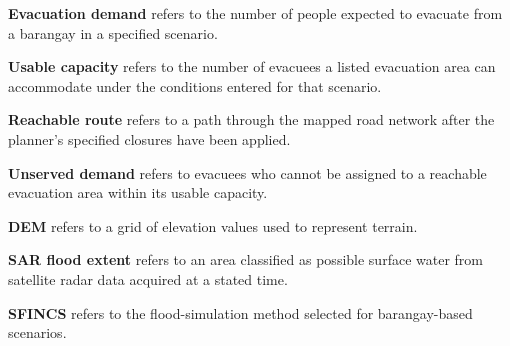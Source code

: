 \textbf{Evacuation demand} refers to the number of people expected to evacuate from a barangay in a specified scenario.

\textbf{Usable capacity} refers to the number of evacuees a listed evacuation area can accommodate under the conditions entered for that scenario.

\textbf{Reachable route} refers to a path through the mapped road network after the planner's specified closures have been applied.

\textbf{Unserved demand} refers to evacuees who cannot be assigned to a reachable evacuation area within its usable capacity.

\textbf{DEM} refers to a grid of elevation values used to represent terrain.

\textbf{SAR flood extent} refers to an area classified as possible surface water from satellite radar data acquired at a stated time.

\textbf{SFINCS} refers to the flood-simulation method selected for barangay-based scenarios.
